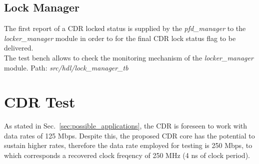 \documentclass[11pt]{article}
\renewcommand{\>}{\rangle} \renewcommand{\emptyset}{\varnothing}
\begin{document}
\subsection{Lock Manager}
The first report of a CDR locked status is supplied by the \textit{pfd\_manager}
to the \textit{locker\_manager} module in order to for the final CDR lock status
flag to be delivered.\\
The test bench allows to check the monitoring mechanism of the
\textit{locker\_manager} module. \bigbreak Path:
\textit{src/hdl/lock\_manager\_tb}

\section{CDR Test} \label{sec:cdr_test} As stated in
Sec.~\ref{sec:possible_applications}, the CDR is foreseen to work with data
rates of 125 Mbps. Despite this, the proposed CDR core has the potential to
sustain higher rates, therefore the data rate employed for testing is 250 Mbps,
to which corresponds a recovered clock freqency of 250 MHz (4 ns of clock
period).
\end{document}
